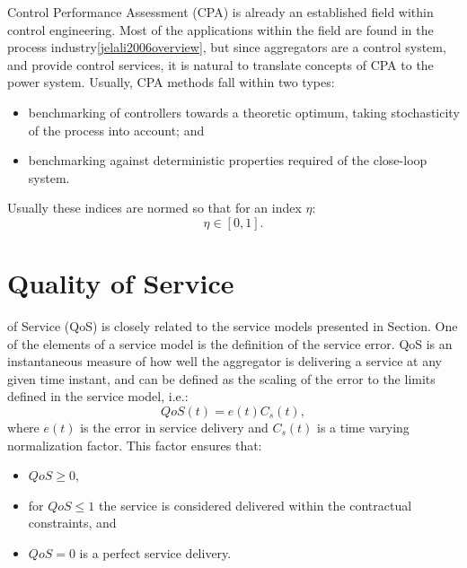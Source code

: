 Control Performance Assessment (CPA) is already an established field within control engineering. Most of the applications within the field are found in the process industry\ref{jelali2006overview}, but since aggregators are a control system, and provide control services, it is natural to translate concepts of CPA to the power system. Usually, CPA methods fall within two types:
\begin{itemize}
	\item benchmarking of controllers towards a theoretic optimum, taking stochasticity of the process into account; and
	\item benchmarking against deterministic properties required of the close-loop system.
\end{itemize}

Usually these indices are normed so that for an index $\eta$:
\begin{equation}
	\eta \in [0,1].
\end{equation}

\section{Quality of Service}\label{sec:MAINQoS}
 of Service (QoS) is closely related to the service models presented in Section. One of the elements of a service model is the definition of the service error. QoS is an instantaneous measure of how well the aggregator is delivering a service at any given time instant, and can be defined as the scaling of the error to the limits defined in the service model, i.e.:
\begin{equation}
	QoS(t) = e(t)C_s(t),
\end{equation}
where $e(t)$ is the error in service delivery and $C_s(t)$ is a time varying normalization factor. This factor ensures that:
\begin{itemize}
	\item $QoS \geq 0$,
	\item for $QoS \leq 1$ the service is considered delivered within the contractual constraints, and
	\item $QoS = 0$ is a perfect service delivery.
\end{itemize}

